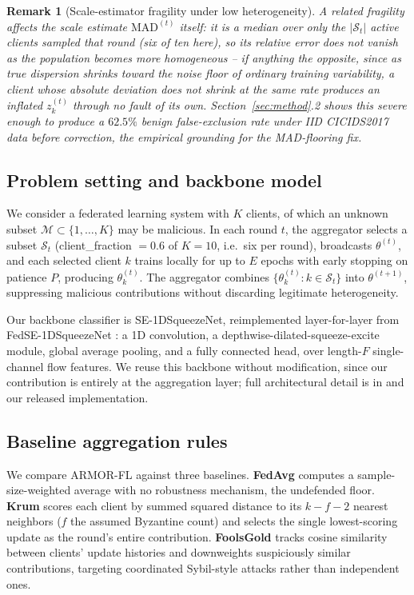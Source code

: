 \documentclass[pdflatex,iicol,sn-mathphys-num]{sn-jnl}%
\theoremstyle{thmstyleone}%
\theoremstyle{thmstyletwo}%
\newtheorem{remark}{Remark}%
\theoremstyle{thmstylethree}%
\begin{document}
\begin{remark}[Scale-estimator fragility under low heterogeneity]\label{rem:mad-fragility}
A related fragility affects the scale estimate $\mathrm{MAD}^{(t)}$ itself: it is a median over only the $|\mathcal{S}_t|$ active clients sampled that round (six of ten here), so its relative error does not vanish as the population becomes more homogeneous -- if anything the opposite, since as true dispersion shrinks toward the noise floor of ordinary training variability, a client whose absolute deviation does not shrink at the same rate produces an inflated $z_k^{(t)}$ through no fault of its own. Section~\ref{sec:method}.2 shows this severe enough to produce a $62.5\%$ benign false-exclusion rate under IID CICIDS2017 data before correction, the empirical grounding for the MAD-flooring fix.
\end{remark}

\subsection{Problem setting and backbone model}

We consider a federated learning system with $K$ clients, of which an unknown subset $\mathcal{M} \subset \{1,\dots,K\}$ may be malicious. In each round $t$, the aggregator selects a subset $\mathcal{S}_t$ (client\_fraction $=0.6$ of $K=10$, i.e.\ six per round), broadcasts $\theta^{(t)}$, and each selected client $k$ trains locally for up to $E$ epochs with early stopping on patience $P$, producing $\theta_k^{(t)}$. The aggregator combines $\{\theta_k^{(t)} : k \in \mathcal{S}_t\}$ into $\theta^{(t+1)}$, suppressing malicious contributions without discarding legitimate heterogeneity.

Our backbone classifier is SE-1DSqueezeNet, reimplemented layer-for-layer from FedSE-1DSqueezeNet \citep{zhou2026fedse1dsqueezenet}: a 1D convolution, a depthwise-dilated-squeeze-excite module, global average pooling, and a fully connected head, over length-$F$ single-channel flow features. We reuse this backbone without modification, since our contribution is entirely at the aggregation layer; full architectural detail is in \citep{zhou2026fedse1dsqueezenet} and our released implementation.

\subsection{Baseline aggregation rules}

We compare ARMOR-FL against three baselines. \textbf{FedAvg} \citep{mcmahan2017fedavg} computes a sample-size-weighted average with no robustness mechanism, the undefended floor. \textbf{Krum} \citep{blanchard2017krum} scores each client by summed squared distance to its $k{-}f{-}2$ nearest neighbors ($f$ the assumed Byzantine count) and selects the single lowest-scoring update as the round's entire contribution. \textbf{FoolsGold} \citep{fung2020foolsgold} tracks cosine similarity between clients' update histories and downweights suspiciously similar contributions, targeting coordinated Sybil-style attacks rather than independent ones.
\end{document}
